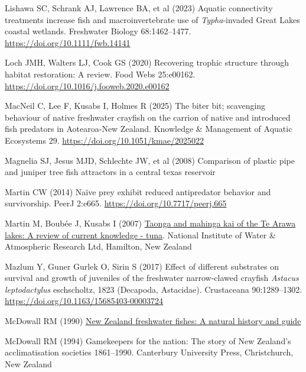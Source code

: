 \documentclass[
  12pt,
  a4paper,
  oneside]{scrbook}
\newlength{\cslhangindent}
\newenvironment{CSLReferences}[2] %
 {\begin{list}{}{%
  \setlength{\itemindent}{0pt}
  \setlength{\leftmargin}{0pt}
  \setlength{\parsep}{0pt}
  \ifodd #1
   \setlength{\leftmargin}{\cslhangindent}
   \setlength{\itemindent}{-1\cslhangindent}
  \fi
  \setlength{\itemsep}{#2\baselineskip}}}
 {\end{list}}
\begin{document}
\begin{CSLReferences}{1}{1}
Lishawa SC, Schrank AJ, Lawrence BA, et al (2023) Aquatic connectivity
treatments increase fish and macroinvertebrate use of
{\emph{Typha}}-invaded {Great Lakes} coastal wetlands. Freshwater
Biology 68:1462--1477. \url{https://doi.org/10.1111/fwb.14141}

Loch JMH, Walters LJ, Cook GS (2020) Recovering trophic structure
through habitat restoration: A review. Food Webs 25:e00162.
\url{https://doi.org/10.1016/j.fooweb.2020.e00162}

MacNeil C, Lee F, Kusabs I, Holmes R (2025) The biter bit; scavenging
behaviour of native freshwater crayfish on the carrion of native and
introduced fish predators in {Aotearoa-New Zealand}. Knowledge \&
Management of Aquatic Ecosystems 29.
\url{https://doi.org/10.1051/kmae/2025022}

Magnelia SJ, Jesus MJD, Schlechte JW, et al (2008) Comparison of plastic
pipe and juniper tree fish attractors in a central texas reservoir

Martin CW (2014) Naïve prey exhibit reduced antipredator behavior and
survivorship. PeerJ 2:e665. \url{https://doi.org/10.7717/peerj.665}

Martin M, Boubée J, Kusabs I (2007)
\href{https://niwa.co.nz/sites/default/files/2025-04/te_arawa_species_report_tuna_0.pdf}{Taonga
and mahinga kai of the {Te Arawa} lakes: A review of current knowledge -
tuna}. {National Institute of Water} \& {Atmospheric Research Ltd},
{Hamilton}, {New Zealand}

Mazlum Y, Guner Gurlek O, Sirin S (2017) Effect of different substrates
on survival and growth of juveniles of the freshwater narrow-clawed
crayfish {\emph{Astacus leptodactylus}} eschscholtz, 1823 ({Decapoda,
Astacidae}). Crustaceana 90:1289--1302.
\url{https://doi.org/10.1163/15685403-00003724}

McDowall RM (1990)
\href{https://agris.fao.org/search/en/providers/122621/records/6473966cce9437aa76003d0e}{{New
Zealand} freshwater fishes: A natural history and guide}

McDowall RM (1994) Gamekeepers for the nation: The story of {New
Zealand}'s acclimatisation societies 1861--1990. Canterbury University
Press, Christchurch, New Zealand


\end{CSLReferences}
\end{document}
